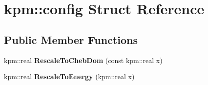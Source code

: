 \hypertarget{structkpm_1_1config}{}\section{kpm\+:\+:config Struct Reference}
\label{structkpm_1_1config}
\subsection*{Public Member Functions}
\begin{DoxyCompactItemize}
\item 
kpm\+::real {\bfseries Rescale\+To\+Cheb\+Dom} (const kpm\+::real x)\hypertarget{structkpm_1_1config_a85a73f07a42d4e47a5814ba15ca2a381}{}\label{structkpm_1_1config_a85a73f07a42d4e47a5814ba15ca2a381}

\item 
kpm\+::real {\bfseries Rescale\+To\+Energy} (kpm\+::real x)\hypertarget{structkpm_1_1config_a4c85bc72133631545b28603f3945d9ba}{}\label{structkpm_1_1config_a4c85bc72133631545b28603f3945d9ba}

\end{DoxyCompactItemize}
